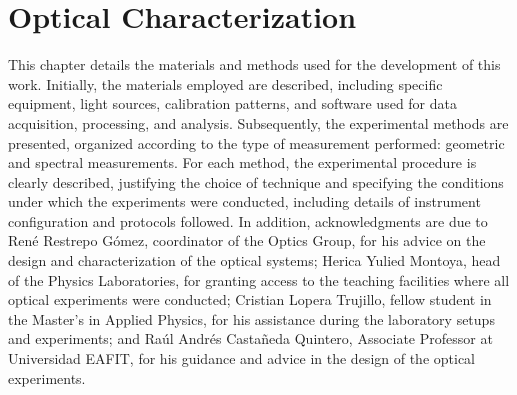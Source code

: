 ﻿\chapter{Optical Characterization}
\label{Chapter4} 

\noindent This chapter details the materials and methods used for the development of this work. Initially, the materials employed are described, including specific equipment, light sources, calibration patterns, and software used for data acquisition, processing, and analysis. Subsequently, the experimental methods are presented, organized according to the type of measurement performed: geometric and spectral measurements. For each method, the experimental procedure is clearly described, justifying the choice of technique and specifying the conditions under which the experiments were conducted, including details of instrument configuration and protocols followed. In addition, acknowledgments are due to René Restrepo Gómez, coordinator of the Optics Group, for his advice on the design and characterization of the optical systems; Herica Yulied Montoya, head of the Physics Laboratories, for granting access to the teaching facilities where all optical experiments were conducted; Cristian Lopera Trujillo, fellow student in the Master's in Applied Physics, for his assistance during the laboratory setups and experiments; and Raúl Andrés Castañeda Quintero, Associate Professor at Universidad EAFIT, for his guidance and advice in the design of the optical experiments.\\






